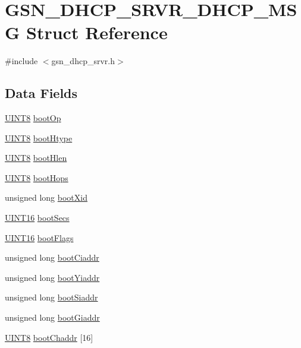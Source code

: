 \hypertarget{a00046}{
\section{GSN\_\-DHCP\_\-SRVR\_\-DHCP\_\-MSG Struct Reference}
\label{a00046}
}


{\ttfamily \#include $<$gsn\_\-dhcp\_\-srvr.h$>$}

\subsection*{Data Fields}
\begin{DoxyCompactItemize}
\item 
\hyperlink{a00660_gab27e9918b538ce9d8ca692479b375b6a}{UINT8} \hyperlink{a00046_a199e9ac2d94217d9267d3e09a3389144}{bootOp}
\item 
\hyperlink{a00660_gab27e9918b538ce9d8ca692479b375b6a}{UINT8} \hyperlink{a00046_ad53ae5a864f26d2fbe06ad714b206ce0}{bootHtype}
\item 
\hyperlink{a00660_gab27e9918b538ce9d8ca692479b375b6a}{UINT8} \hyperlink{a00046_a366bc11312e460bb188070016094cf47}{bootHlen}
\item 
\hyperlink{a00660_gab27e9918b538ce9d8ca692479b375b6a}{UINT8} \hyperlink{a00046_a10c0d3467e6ca1d91a79eb52b8849b6b}{bootHops}
\item 
unsigned long \hyperlink{a00046_a7c30634c6eaa55ec623c235e8019e2c4}{bootXid}
\item 
\hyperlink{a00660_ga09f1a1fb2293e33483cc8d44aefb1eb1}{UINT16} \hyperlink{a00046_a64a68d29c3d9d4110f8e1bfb1ad1ce11}{bootSecs}
\item 
\hyperlink{a00660_ga09f1a1fb2293e33483cc8d44aefb1eb1}{UINT16} \hyperlink{a00046_a0612cc761a70188aafc3e33f50caee69}{bootFlags}
\item 
unsigned long \hyperlink{a00046_aab4e6c0f4dcf01263f1adf6f33e2ab6d}{bootCiaddr}
\item 
unsigned long \hyperlink{a00046_aa41ec004ca53a19130117115df4490c1}{bootYiaddr}
\item 
unsigned long \hyperlink{a00046_a2a5ac8561740fade922c8910a1673fc3}{bootSiaddr}
\item 
unsigned long \hyperlink{a00046_a3a95eb696914a23297c224d06d4e31e7}{bootGiaddr}
\item 
\hyperlink{a00660_gab27e9918b538ce9d8ca692479b375b6a}{UINT8} \hyperlink{a00046_a087f494fda2caad84904be6ab979c237}{bootChaddr} \mbox{[}16\mbox{]}
\item 

\end{DoxyCompactItemize}
